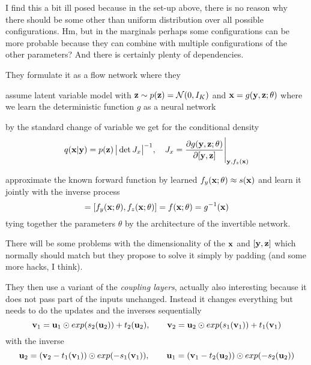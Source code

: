 I find this a bit ill posed because in the set-up above, there is no reason why there should be some other than uniform distribution over all possible configurations. Hm, but in the marginals perhaps some configurations can be more probable because they can combine with multiple configurations of the other parameters? And there is certainly plenty of dependencies.

They formulate it as a flow network where they 
\begin{compactitem}
\item assume latent variable model with $\mathbf{z} \sim p(\mathbf{z}) = \mathcal{N}(0, I_K)$ and $\mathbf{x} = g(\mathbf{y}, \mathbf{z}; \theta)$ where we learn the deterministic function $g$ as a neural network
\item by the standard change of variable we get for the conditional density
\begin{equation}\label{eqinverse:conditional}
q(\mathbf{x} | \mathbf{y}) = p(\mathbf{z}) \, \big\lvert \det J_x \big\rvert^{-1}, \quad 
J_x = \frac{\partial g(\mathbf{y}, \mathbf{z}; \theta)}{\partial [\mathbf{y}, \mathbf{z}]} \Bigg\rvert_{\mathbf{y}, f_z(\mathbf{x})}
\end{equation}
\item approximate the known forward function by learned $f_y(\mathbf{x}; \theta) \approx s(\mathbf{x})$ and learn it jointly with the inverse process
\begin{equation}
[\by, \bz] = [f_y(\bx; \theta), f_z(\bx; \theta)] = f(\bx; \theta) = g^{-1}(\bx)
\end{equation}
tying together the parameters $\theta$ by the architecture of the invertible network. 
\end{compactitem}

There will be some problems with the dimensionality of the $\mathbf{x}$ and $[\mathbf{y}, \mathbf{z}]$ which normally should match but they propose to solve it simply by padding (and some more hacks, I think).

They then use a variant of the \emph{coupling layers}, actually also interesting because it does not pass part of the inputs unchanged. Instead it changes everything but needs to do the updates and the inverses sequentially
\begin{equation}
\mathbf{v}_1 = \mathbf{u}_1 \odot exp(s_2(\mathbf{u}_2)) + t_2(\mathbf{u}_2), \qquad
\mathbf{v}_2 = \mathbf{u}_2 \odot exp(s_1(\mathbf{v}_1)) + t_1(\mathbf{v}_1)
\end{equation}
with the inverse
\begin{equation}
\mathbf{u}_2 = (\mathbf{v}_2 - t_1(\mathbf{v}_1)) \odot exp(-s_1(\mathbf{v}_1)), \qquad
\mathbf{u}_1 = (\mathbf{v}_1 - t_2(\mathbf{u}_2)) \odot exp(-s_2(\mathbf{u}_2))
\end{equation}

